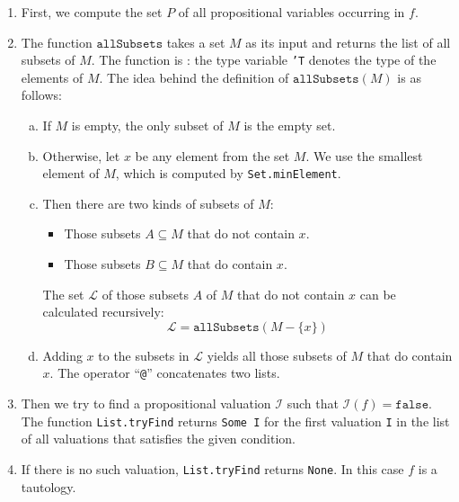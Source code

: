\begin{enumerate}
\item First, we compute the set $P$ of all propositional variables occurring in $f$.
\item The function $\mathtt{allSubsets}$ takes a set $M$ as its input and returns the list of all subsets of $M$.
      The function is : the type variable \texttt{'T} denotes the type of the elements of $M$.
      The idea behind the definition of $\mathtt{allSubsets}(M)$ is as follows:
      \begin{enumerate}[(a)]
      \item If $M$ is empty, the only subset of $M$ is the empty set.
      \item Otherwise, let $x$ be any element from the set $M$.  We use the smallest element of $M$, which is
            computed by \texttt{Set.minElement}. 
      \item Then there are two kinds of subsets of $M$:
        \begin{itemize}
        \item Those subsets $A \subseteq M$ that do not contain $x$.
        \item Those subsets $B \subseteq M$ that do contain $x$.
      \end{itemize}
      The set $\mathcal{L}$ of those subsets $A$ of $M$ that do not contain $x$ can be calculated recursively:
      $$ \mathcal{L} = \texttt{allSubsets}(M - \{x\}) $$
      \item Adding $x$ to the subsets in $\mathcal{L}$ yields all those subsets of $M$ that do contain $x$. 
            The operator ``\texttt{@}'' concatenates two lists.
      \end{enumerate}  
\item Then we try to find a propositional valuation $\mathcal{I}$ such that $\mathcal{I}(f) = 
      \texttt{false}$.  The function \texttt{List.tryFind} returns \texttt{Some I} for the first valuation
      \texttt{I} in the list of all valuations that satisfies the given condition. 
\item If there is no such valuation, \texttt{List.tryFind} returns \texttt{None}.  In this case $f$ is a
      tautology.
\end{enumerate}

